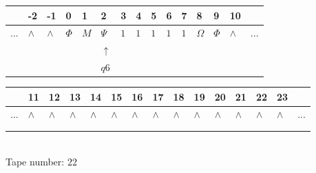 \documentclass[11pt]{article}
\begin{document}
\begin{table}[H]
\centering
\begin{tabular}{lllllllllllllll}
 & -2 & -1 & 0 & 1 & 2 & 3 & 4 & 5 & 6 & 7 & 8 & 9 & 10 & \\
\hline
$...$ & \multicolumn{1}{|l|}{$\wedge$} & \multicolumn{1}{|l|}{$\wedge$} & \multicolumn{1}{|l|}{$\Phi$} & \multicolumn{1}{|l|}{$M$} & \multicolumn{1}{|l|}{$\Psi$} & \multicolumn{1}{|l|}{$1$} & \multicolumn{1}{|l|}{$1$} & \multicolumn{1}{|l|}{$1$} & \multicolumn{1}{|l|}{$1$} & \multicolumn{1}{|l|}{$1$} & \multicolumn{1}{|l|}{$\Omega$} & \multicolumn{1}{|l|}{$\Phi$} & \multicolumn{1}{|l|}{$\wedge$} & $...$\\
\hline
&  &  &  &  & $\uparrow$ &  &  &  &  &  &  &  &  &  \\
&  &  &  &  & $ q6 $ &  &  &  &  &  &  &  &  &  \\
\end{tabular}
\begin{tabular}{lllllllllllllll}
 & 11 & 12 & 13 & 14 & 15 & 16 & 17 & 18 & 19 & 20 & 21 & 22 & 23 & \\
\hline
$...$ & \multicolumn{1}{|l|}{$\wedge$} & \multicolumn{1}{|l|}{$\wedge$} & \multicolumn{1}{|l|}{$\wedge$} & \multicolumn{1}{|l|}{$\wedge$} & \multicolumn{1}{|l|}{$\wedge$} & \multicolumn{1}{|l|}{$\wedge$} & \multicolumn{1}{|l|}{$\wedge$} & \multicolumn{1}{|l|}{$\wedge$} & \multicolumn{1}{|l|}{$\wedge$} & \multicolumn{1}{|l|}{$\wedge$} & \multicolumn{1}{|l|}{$\wedge$} & \multicolumn{1}{|l|}{$\wedge$} & \multicolumn{1}{|l|}{$\wedge$} & $...$\\
\hline
&  &  &  &  &  &  &  &  &  &  &  &  &  &  \\
&  &  &  &  &  &  &  &  &  &  &  &  &  &  \\
\end{tabular}
\\
Tape number: 22
\noindent\makebox[\linewidth]{\hdashrule{\textwidth}{1pt}{1pt}}\end{table}
\end{document}
